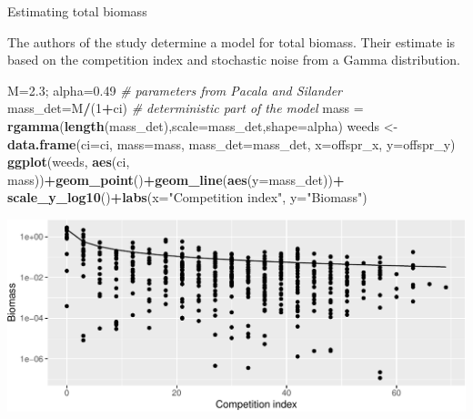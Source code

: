 \documentclass[
  ignorenonframetext,
]{beamer}
\newenvironment{Shaded}{\begin{snugshade}}{\end{snugshade}}
\newcommand{\CommentTok}[1]{\textcolor[rgb]{0.56,0.35,0.01}{\textit{#1}}}
\newcommand{\DataTypeTok}[1]{\textcolor[rgb]{0.13,0.29,0.53}{#1}}
\newcommand{\DecValTok}[1]{\textcolor[rgb]{0.00,0.00,0.81}{#1}}
\newcommand{\FloatTok}[1]{\textcolor[rgb]{0.00,0.00,0.81}{#1}}
\newcommand{\KeywordTok}[1]{\textcolor[rgb]{0.13,0.29,0.53}{\textbf{#1}}}
\newcommand{\NormalTok}[1]{#1}
\newcommand{\OperatorTok}[1]{\textcolor[rgb]{0.81,0.36,0.00}{\textbf{#1}}}
\newcommand{\StringTok}[1]{\textcolor[rgb]{0.31,0.60,0.02}{#1}}
\begin{document}
\begin{frame}[fragile]{Estimating total biomass}
\protect\hypertarget{estimating-total-biomass}{}

The authors of the study determine a model for total biomass. Their
estimate is based on the competition index and stochastic noise from a
Gamma distribution. \scriptsize

\begin{Shaded}
\begin{Highlighting}[]
\NormalTok{M=}\FloatTok{2.3}\NormalTok{; alpha=}\FloatTok{0.49} \CommentTok{# parameters from Pacala and Silander}
\NormalTok{mass_det=M}\OperatorTok{/}\NormalTok{(}\DecValTok{1}\OperatorTok{+}\NormalTok{ci) }\CommentTok{# deterministic part of the model}
\NormalTok{mass =}\StringTok{ }\KeywordTok{rgamma}\NormalTok{(}\KeywordTok{length}\NormalTok{(mass_det),}\DataTypeTok{scale=}\NormalTok{mass_det,}\DataTypeTok{shape=}\NormalTok{alpha)}
\NormalTok{weeds <-}\StringTok{ }\KeywordTok{data.frame}\NormalTok{(}\DataTypeTok{ci=}\NormalTok{ci, }\DataTypeTok{mass=}\NormalTok{mass, }\DataTypeTok{mass_det=}\NormalTok{mass_det, }
                    \DataTypeTok{x=}\NormalTok{offspr_x, }\DataTypeTok{y=}\NormalTok{offspr_y)}
\KeywordTok{ggplot}\NormalTok{(weeds, }\KeywordTok{aes}\NormalTok{(ci, mass))}\OperatorTok{+}\KeywordTok{geom_point}\NormalTok{()}\OperatorTok{+}\KeywordTok{geom_line}\NormalTok{(}\KeywordTok{aes}\NormalTok{(}\DataTypeTok{y=}\NormalTok{mass_det))}\OperatorTok{+}
\StringTok{  }\KeywordTok{scale_y_log10}\NormalTok{()}\OperatorTok{+}\KeywordTok{labs}\NormalTok{(}\DataTypeTok{x=}\StringTok{"Competition index"}\NormalTok{, }\DataTypeTok{y=}\StringTok{"Biomass"}\NormalTok{)}
\end{Highlighting}
\end{Shaded}

\includegraphics{simulation_files/figure-beamer/unnamed-chunk-18-1.pdf}

\end{frame}
\end{document}
